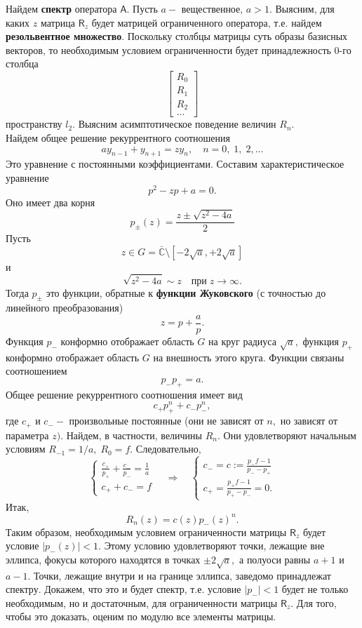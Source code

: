 \documentclass[12 pt, a4 paper]{article}
\theoremstyle{plain}   \newtheorem{Pro}{Задача}
\begin{document}
Найдем
{\bfseries спектр}
оператора
$ \mathsf{A} . $
Пусть
$ a - $
вещественное,
$ a>1. $
Выясним, для каких
$ z $
матрица
$ \mathsf{R}_z $
будет матрицей ограниченного оператора,
т.е. найдем
{\bfseries резольвентное множество}.
Поскольку столбцы матрицы суть образы базисных векторов, то
необходимым условием ограниченности будет принадлежность
0-го столбца
\begin{equation*}
  \begin{bmatrix}
    R_0 \\
	R_1 \\
	R_2 \\
	\dots
  \end{bmatrix}
\end{equation*}
пространству
$ l_2 . $
Выясним асимптотическое поведение величин
$ R_n . $
\\

Найдем общее решение рекуррентного соотношения
$$
  a y_{n-1} + y_{n+1}= z y_n ,
  \quad n=0, \; 1, \; 2,...
$$
Это уравнение с постоянными коэффициентами. Составим
характеристическое уравнение
$$
  p^2 -zp +a =0.
$$
Оно имеет два корня
$$
  p_{\pm}(z)=\frac{z \pm \sqrt{z^2 -4a}}{2}
$$
Пусть
$$
  z \in G = \bar{\mathbb{C}} \setminus
  [-2 \sqrt{a}, +2\sqrt{a}]
$$
и
$$
  \sqrt{z^2 -4a} \sim z \quad при \; z \rightarrow \infty .
$$
Тогда
$ p_{\pm} $
это функции, обратные к
{\bfseries функции Жуковского}
(с точностью до линейного преобразования)
$$
  z=p+\frac{a}{p}.
$$
Функция
$ p_- $
конформно отображает область
$ G $
на круг радиуса
$ \sqrt{a} ,$
функция
$ p_+ $
конформно отображает область
$ G $
на внешность этого круга. Функции связаны соотношением
$$
  p_- p_+ =a.
$$
Общее решение рекуррентного соотношения имеет вид
$$
  c_+ p_+ ^n + c_- p_- ^n ,
$$
где
$ c_+ $ и $ c_- - $
произвольные постоянные (они не зависят от
$ n ,$
но зависят от параметра
$ z ). $
Найдем, в частности, величины
$ R_n . $
Они удовлетворяют начальным условиям
$ R_{-1}=1/a , \; R_0 =f. $
Следовательно,
\begin{equation*}
  \begin{cases}
    \frac{c_+}{p_+}+\frac{c_-}{p_-} =\frac{1}{a}\\
	c_+ +c_- =f
  \end{cases}
  \quad \Rightarrow \quad
  \begin{cases}
    c_- =c := \frac{p_- f -1}{p_- -p_+}\\
	c_+ = \frac{p_+ f -1 }{p_+ - p_- } =0.
  \end{cases}
\end{equation*}
Итак,
$$
  R_n (z) = c(z) p_- (z)^n .
$$
Таким образом, необходимым условием ограниченности матрицы
$ \mathsf{R}_z $
будет условие
$ |p_- (z) | < 1 . $
Этому условию удовлетворяют точки, лежащие вне эллипса,
фокусы которого находятся в точках
$ \pm 2 \sqrt{a} , $
а полуоси равны
$ a+1 $ и $ a-1 . $
Точки, лежащие внутри и на границе эллипса, заведомо принадлежат
спектру. Докажем, что это и будет спектр, т.е. условие
$ |p_- |<1 $
будет не только необходимым, но и достаточным, для ограниченности
матрицы
$ \mathsf{R}_z .$
Для того, чтобы это доказать, оценим по модулю все элементы матрицы.
\\
\end{document}
